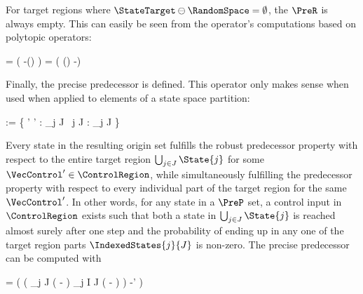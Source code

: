     For target regions where $\StateTarget \ominus \RandomSpace = \emptyset$, the $\PreR$ is always empty.
    This can easily be seen from the operator's computations based on polytopic operators:

    \startformula
        \startalign[n=2,align={right,left}]
            \NC {} =
            \NC \StateRegion \cap \Big( \StateTarget \oplus -(\MatB \ControlRegion \oplus \RandomSpace) \Big) \MatA \EndAnd
            \NR
            \NC {} =
            \NC \StateRegion \cap \Big( (\StateTarget \ominus \RandomSpace) \oplus -\MatB \ControlRegion \Big) \MatA \EndPeriod
            \NR
        \stopalign
    \stopformula

    Finally, the precise predecessor is defined.
    This operator only makes sense when used when applied to elements of a state space partition:

    \startformula
        \startalign[n=2,align={right,left}]
            \NC {} := \Big\{ \VecState \in \StateRegion \Bigmid \exists \VecControl' \in \ControlSpace' :
            \NC {} \subseteq \bigcup_{j \in J}  \;
            \NR
            \NC \empty
            \NC ~\forall j \in J :  \cap \bigcup_{j \in J}  \neq \emptyset \Big\} \EndPeriod
            \NR
        \stopalign
    \stopformula

    Every state in the resulting origin set fulfills the robust predecessor property with respect to the entire target region $\bigcup_{j \in J} \State{j}$ for some $\VecControl' \in \ControlRegion$, while simultaneously fulfilling the predecessor property with respect to every individual part of the target region for the same $\VecControl'$.
    In other words, for any state in a $\PreP$ set, a control input in $\ControlRegion$ exists such that both a state in $\bigcup_{j \in J} \State{j}$ is reached almost surely after one step and the probability of ending up in any one of the target region parts $\IndexedStates{j}{J}$ is non-zero.
    The precise predecessor can be computed with

    \startformula
         =
        \StateRegion \cap \Big( \Big( \bigcap_{j \in J} ( \oplus - \RandomSpace) \setminus \bigcup_{j \in I \setminus J} (  \oplus - \RandomSpace ) \Big) \oplus -\MatB \ControlSpace' \Big) \MatA \EndComma
    \stopformula

